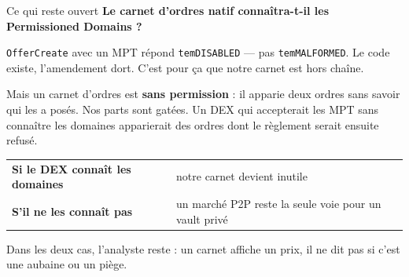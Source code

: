 \documentclass[aspectratio=169,11pt]{beamer}
\newcommand{\tc}[1]{{\small\texttt{#1}}}
\begin{document}
\begin{frame}{Ce qui reste ouvert}
\vspace{8pt}
{\color{accent}\Large\textbf{Le carnet d'ordres natif connaîtra-t-il les Permissioned Domains ?}}
\vspace{10pt}

\tc{OfferCreate} avec un MPT répond \tc{temDISABLED} --- pas \tc{temMALFORMED}. Le code
existe, l'amendement dort. C'est pour ça que notre carnet est hors chaîne.
\vspace{8pt}

Mais un carnet d'ordres est \textbf{sans permission} : il apparie deux ordres sans savoir qui
les a posés. Nos parts sont gatées. Un DEX qui accepterait les MPT sans connaître les domaines
apparierait des ordres dont le règlement serait ensuite refusé.
\vspace{10pt}

\begin{center}
\begin{tabular}{@{}ll@{}}
\toprule
\textbf{Si le DEX connaît les domaines} & notre carnet devient inutile\\
\textbf{S'il ne les connaît pas} & un marché P2P reste la seule voie pour un vault privé\\
\bottomrule
\end{tabular}
\end{center}
\vspace{8pt}

{\small\color{ink2}Dans les deux cas, l'analyste reste : un carnet affiche un prix, il ne dit
pas si c'est une aubaine ou un piège.}
\end{frame}
\end{document}
